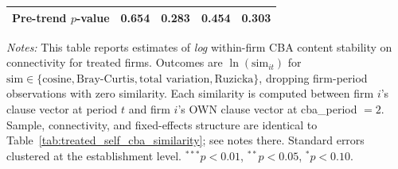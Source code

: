 \begin{table}[H]
\begin{tabular}{lcccc}
Pre-trend $p$-value & 0.654 & 0.283 & 0.454 & 0.303 \\
\bottomrule
\end{tabular}
\begin{minipage}{\linewidth}
\footnotesize\vspace{4pt}
\textit{Notes:} This table reports estimates of \emph{log} within-firm CBA content stability on connectivity for treated firms. Outcomes are $\ln(\text{sim}_{it})$ for $\text{sim} \in \{\text{cosine}, \text{Bray-Curtis}, \text{total variation}, \text{Ruzicka}\}$, dropping firm-period observations with zero similarity. Each similarity is computed between firm $i$'s clause vector at period $t$ and firm $i$'s OWN clause vector at cba\_period $= 2$. Sample, connectivity, and fixed-effects structure are identical to Table~\ref{tab:treated_self_cba_similarity}; see notes there. Standard errors clustered at the establishment level. $^{***}p<0.01$, $^{**}p<0.05$, $^{*}p<0.10$.
\end{minipage}
\end{table}
